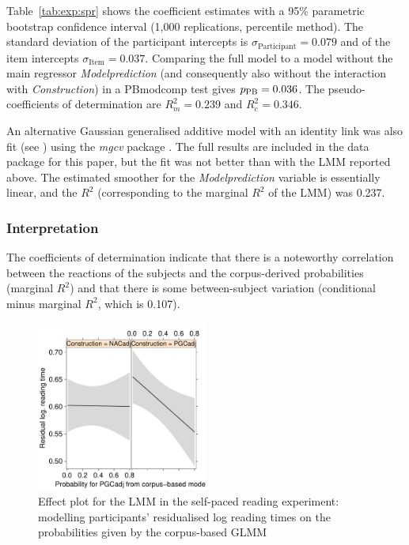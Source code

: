 Table~\ref{tab:exp:spr} shows the coefficient estimates with a 95\% parametric bootstrap confidence interval (1,000 replications, percentile method).
The standard deviation of the participant intercepts is $\sigma_{\text{Participant}}=0.079$ and of the item intercepts $\sigma_{\text{Item}}=0.037$.
Comparing the full model to a model without the main regressor \textit{Modelprediction} (and consequently also without the interaction with \textit{Construction}) in a PBmodcomp test gives $p_{\text{PB}}=0.036$.
The pseudo-coefficients of determination are $R^2_m=0.239$ and $R^2_c=0.346$.

An alternative Gaussian generalised additive model with an identity link was also fit (see \citealp{DivjakEa2016}) using the \textit{mgcv} package \citep{Wood2011}.
The full results are included in the data package for this paper, but the fit was not better than with the LMM reported above.
The estimated smoother for the \textit{Modelprediction} variable is essentially linear, and the $R^2$ (corresponding to the marginal $R^2$ of the LMM) was 0.237.

\subsubsection{Interpretation}

The coefficients of determination indicate that there is a noteworthy correlation between the reactions of the subjects and the corpus-derived probabilities (marginal $R^2$) and that there is some between-subject variation (conditional minus marginal $R^2$, which is 0.107).

\begin{figure}[htbp!]
\centering
\includegraphics[width=0.5\textwidth]{../R/output/spr_effects}
\caption{Effect plot for the LMM in the self-paced reading experiment: modelling participants' residualised log reading times on the probabilities given by the corpus-based GLMM}
\label{fig:spr:effects}
\end{figure}

